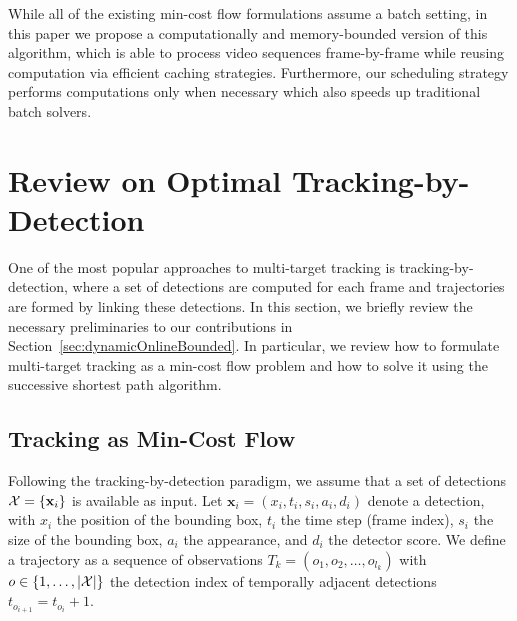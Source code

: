 \documentclass[10pt,twocolumn,letterpaper]{article}
\newcommand{\bx}{\mathbf{x}}
\newcommand{\secref}[1]{Section~\ref{#1}}
\begin{document}
While all of the existing min-cost flow formulations assume a batch setting, in this paper we propose a computationally and memory-bounded version of this algorithm, which is able to process video sequences frame-by-frame while reusing computation via efficient caching strategies. Furthermore, our scheduling strategy performs computations only when necessary which also speeds up traditional batch solvers. \section{Review on Optimal Tracking-by-Detection} \label{sec:review}

One of the most popular approaches to multi-target tracking is tracking-by-detection, where a set of detections are computed for each frame and trajectories are formed by linking these detections. 
In this section, we briefly review the necessary preliminaries to our contributions in \secref{sec:dynamicOnlineBounded}. In particular, we review how to formulate multi-target tracking as a min-cost flow problem and how to solve it using the successive shortest path algorithm.


\subsection{Tracking as Min-Cost Flow}

Following the tracking-by-detection paradigm, we assume that a set of detections ${\cal X} = \{\bx_i\}$ is available as input. 
Let $\bx_i = (x_i,t_i,s_i,a_i,d_i)$ denote a detection, with $x_i$ the position of the bounding box, $t_i$ the time step (frame index), $s_i$ the size of the bounding box, $a_i$ the appearance, and $d_i$ the detector score. 
We define a trajectory as a sequence of observations $T_k = (o_1, o_2, \ldots,  o_{l_k})$ with $o\in\{1,\ldots,|\cal X|\}$ the detection index of  temporally adjacent detections $t_{o_{i+1}} = t_{o_i}+1$.  
\end{document}
